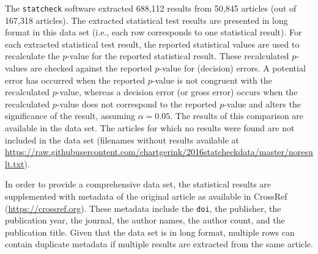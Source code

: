\documentclass[a5paper]{book}
\begin{document}
\begin{landscape}\begin{table}[t]

\caption{\label{tab:data-1}An overview of the publishers included accompanied by descriptive statistics per publisher regarding the extracted APA results.}
\centering
{}
\end{table}
\end{landscape}

The \texttt{statcheck} software extracted 688,112 results from 50,845
articles (out of 167,318 articles). The extracted statistical test
results are presented in long format in this data set (i.e., each row
corresponds to one statistical result). For each extracted statistical
test result, the reported statistical values are used to recalculate the
\(p\)-value for the reported statistical result. These recalculated
\(p\)-values are checked against the reported \(p\)-value for (decision)
errors. A potential error has occurred when the reported \(p\)-value is
not congruent with the recalculated \(p\)-value, whereas a decision
error (or gross error) occurs when the recalculated \(p\)-value does not
correspond to the reported \(p\)-value and alters the significance of
the result, assuming \(\alpha=0.05\). The results of this comparison are
available in the data set. The articles for which no results were found
are not included in the data set (filenames without results available at
\url{https://raw.githubusercontent.com/chartgerink/2016statcheckdata/master/noresult.txt}).

In order to provide a comprehensive data set, the statistical results
are supplemented with metadata of the original article as available in
CrossRef (\url{https://crossref.org}). These metadata include the
\texttt{doi}, the publisher, the publication year, the journal, the
author names, the author count, and the publication title. Given that
the data set is in long format, multiple rows can contain duplicate
metadata if multiple results are extracted from the same article.
\end{document}
